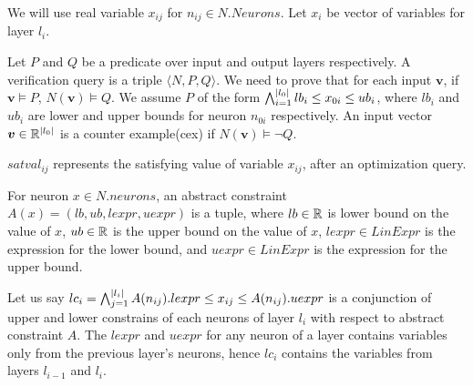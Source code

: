 
We will use real variable $x_{ij}$ for $n_{ij} \in N.Neurons$.
Let $x_i$ be vector of variables for layer $l_i$.

Let $P$ and $Q$ be a predicate over input and output layers respectively.
A verification query is a triple $\langle N, P, Q \rangle$.
We need to prove that for each input $\boldsymbol{v}$,
if $\boldsymbol{v} \models P$, $N(\boldsymbol{v}) \models Q$.
We assume $P$ of the form
$\bigwedge_{i=1}^{|l_0|}lb_i \leq x_{0i} \leq ub_i$, where $lb_i$ and $ub_i$ are lower and upper bounds for neuron $n_{0i}$ respectively.
An input vector $\boldsymbol{v} \in \mathbb{R}^{|l_0|}$ is a counter example(cex) if $N(\boldsymbol{v}) \models \lnot Q$.  



$satval_{ij}$ represents the satisfying value of variable $x_{ij}$, after an optimization query.






\begin{df}
  For neuron $x \in N.neurons$,
  an abstract constraint $A(x) = (lb,ub, lexpr, uexpr)$ is a tuple, where
  $lb \in \mathbb{R}$ is lower bound on the value of $x$,
  $ub \in \mathbb{R}$ is the upper bound on the value of  $x$,
  $lexpr \in LinExpr$ is the expression for the lower bound, and
  $uexpr \in LinExpr$ is the expression for the upper bound.
\end{df}

Let us say $lc_i = \bigwedge_{j=1}^{|l_i|} A(n_{ij}).lexpr \leq x_{ij} \leq  A(n_{ij}).uexpr$ is a 
conjunction of upper and lower constrains of each neurons of layer $l_i$ with respect to abstract constraint $A$.
The $lexpr$ and $uexpr$ for any neuron of a layer contains variables only from the previous layer's neurons, 
hence $lc_i$ contains the variables from layers $l_{i-1}$ and $l_i$. 

